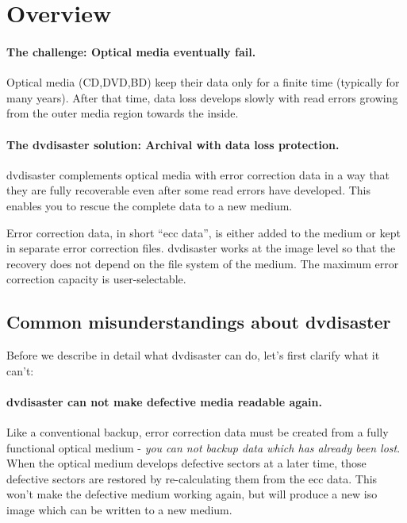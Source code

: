 \section{Overview}

\paragraph{The challenge: Optical media eventually fail.} Optical media (CD,DVD,BD) keep their data only for a finite time (typically for many years). 
After that time, data loss develops slowly with read errors growing from the outer 
media region towards the inside. 

\paragraph{The dvdisaster solution: Archival with data loss protection.}
dvdisaster complements optical media  with
error correction data
in a way that they are fully recoverable 
even after some read errors have developed. 
This enables you to rescue the complete data to a new medium.

Error correction data, in short ``ecc data'',  is either added to the medium 
or kept in separate error correction files. dvdisaster works at the image level 
so that the recovery does not depend on the file system of the medium. 
The maximum error correction capacity is user-selectable.

\subsection{Common misunderstandings about dvdisaster}

Before we describe in detail what dvdisaster can do, let's first clarify what it can't:

\paragraph{dvdisaster can not make defective media readable again.}
Like a conventional backup, error correction data must be created from 
a fully functional optical medium - {\em you can not backup data which has already
been lost}. When the optical medium develops defective sectors at a later time,
those defective sectors are restored by re-calculating them from the ecc data. 
This won't make the defective medium working again, but will produce a new iso 
image which can be written to a new medium. 

